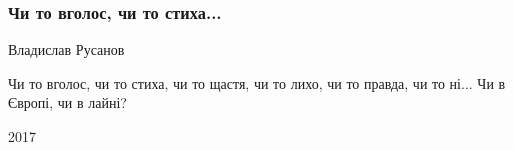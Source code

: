  
 
 

\subsubsection{Чи то вголос, чи то стиха...}
\label{sec:poetry.rus.dnr.vladislav_rusanov.chy_to_v_golos}

Владислав Русанов

Чи то вголос, чи то стиха,
чи то щастя, чи то лихо,
чи то правда, чи то ні...
Чи в Європі, чи в лайні?

2017 
